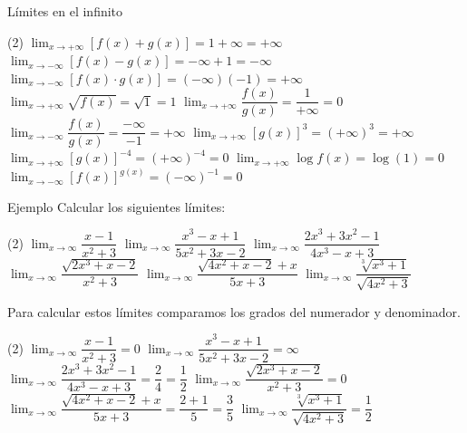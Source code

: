 \documentclass[8pt]{beamer}
\newcommand{\limite}[2]{\displaystyle \lim_{x \rightarrow #1}{#2}}
\begin{document}
\begin{frame}{Límites en el infinito}
\begin{tasks}[label=\alph*)](2)
\task* $\limite{+\infty}{\left[ f(x)+g(x) \right] } = 1+\infty= +\infty$
\task* $\limite{-\infty}{\left[ f(x)-g(x) \right] } = -\infty+1=-\infty$
\task* $\limite{-\infty}{\left[ f(x)\cdot g(x) \right] }=(-\infty)(-1)=+\infty $
\task* $\limite{+\infty}{\sqrt{ f(x)} }= \sqrt{1}=1 $
\task $\limite{+\infty}{\dfrac{f(x)}{g(x)} }= \dfrac{1}{+\infty}=0$
\task $\limite{-\infty}{\dfrac{f(x)}{g(x)} }=\dfrac{-\infty}{-1}=+\infty$
\task $\limite{+\infty}{\left[ g(x) \right]^3 }= (+\infty)^3=+\infty$
\task $\limite{+\infty}{\left[ g(x) \right]^{-4} }=(+\infty)^{-4} = 0$
\task $\limite{+\infty}{\log f(x) }= \log(1)=0$
\task $\limite{-\infty}{\left[ f(x) \right]^{g(x)} } =(-\infty)^{-1}=0$
\end{tasks}

\end{frame}
\begin{frame}
\begin{exampleblock}{Ejemplo}
Calcular los siguientes límites:
\begin{tasks}[label=\alph*)](2)
\task $\limite{\infty}{\dfrac{x-1}{x^2+3} }$
\task $\limite{\infty}{\dfrac{x^3-x+1}{5x^2+3x-2} }$
\task $\limite{\infty}{\dfrac{2x^3+3x^2-1}{4x^3-x+3} }$
\task $\limite{\infty}{\dfrac{\sqrt{2x^3+x-2}}{x^2+3} }$
\task $\limite{\infty}{\dfrac{\sqrt{4x^2+x-2}+x}{5x+3} }$
\task $\limite{\infty}{\dfrac{\sqrt[3]{x^3+1}}{\sqrt{4x^2+3}} }$
\end{tasks}
\end{exampleblock}

Para calcular estos límites comparamos los grados del numerador y denominador.

\begin{tasks}[label=\alph*)](2)
\task $\limite{\infty}{\dfrac{x-1}{x^2+3} }= 0$
\task $\limite{\infty}{\dfrac{x^3-x+1}{5x^2+3x-2} }= \infty$
\task $\limite{\infty}{\dfrac{2x^3+3x^2-1}{4x^3-x+3} }= \dfrac{2}{4}=\dfrac{1}{2}$
\task $\limite{\infty}{\dfrac{\sqrt{2x^3+x-2}}{x^2+3} }= 0$
\task* $\limite{\infty}{\dfrac{\sqrt{4x^2+x-2}+x}{5x+3} }= \dfrac{2+1}{5}=\dfrac{3}{5}$
\task* $\limite{\infty}{\dfrac{\sqrt[3]{x^3+1}}{\sqrt{4x^2+3}} }= \dfrac{1}{2}$
\end{tasks}
\end{frame}
\end{document}
